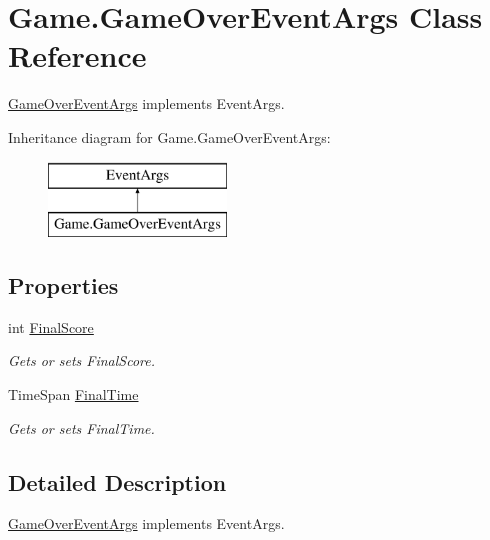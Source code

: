 \hypertarget{class_game_1_1_game_over_event_args}{}\section{Game.\+Game\+Over\+Event\+Args Class Reference}
\label{class_game_1_1_game_over_event_args}


\mbox{\hyperlink{class_game_1_1_game_over_event_args}{Game\+Over\+Event\+Args}} implements Event\+Args.  


Inheritance diagram for Game.\+Game\+Over\+Event\+Args\+:\begin{figure}[H]
\begin{center}
\leavevmode
\includegraphics[height=2.000000cm]{class_game_1_1_game_over_event_args}
\end{center}
\end{figure}
\subsection*{Properties}
\begin{DoxyCompactItemize}
\item 
int \mbox{\hyperlink{class_game_1_1_game_over_event_args_a33e39edb9b10bad5fae08e89ac7d140d}{Final\+Score}}
\begin{DoxyCompactList}\small\item\em Gets or sets Final\+Score. \end{DoxyCompactList}\item 
Time\+Span \mbox{\hyperlink{class_game_1_1_game_over_event_args_af5fe5cd1376d05801b41a1c75626ee0d}{Final\+Time}}
\begin{DoxyCompactList}\small\item\em Gets or sets Final\+Time. \end{DoxyCompactList}\end{DoxyCompactItemize}


\subsection{Detailed Description}
\mbox{\hyperlink{class_game_1_1_game_over_event_args}{Game\+Over\+Event\+Args}} implements Event\+Args. 



